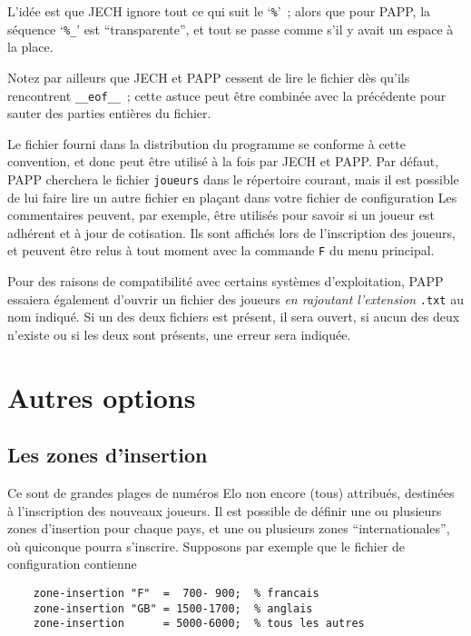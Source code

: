 \documentclass[10pt]{article}
\begin{document}
	L'id\'ee est que JECH ignore tout ce qui suit le `\verb|%|'~; alors
que pour PAPP, la s\'equence `\verb|%_|' est ``transparente'', et tout se
passe comme s'il y avait un espace \`a la place. 

	Notez par ailleurs que JECH et PAPP cessent de lire le fichier
d\`es qu'ils rencontrent \verb|__eof__|~; cette astuce peut \^etre
combin\'ee avec la pr\'ec\'edente pour sauter des parties enti\`eres du
fichier. 

	Le fichier fourni dans la distribution du programme se conforme
\`a cette convention, et donc peut \^etre utilis\'e \`a la fois par JECH
et PAPP.  Par d\'efaut, PAPP cherchera le fichier \verb|joueurs| dans le
r\'epertoire courant, mais il est possible de lui faire lire un autre
fichier en pla\c cant dans votre fichier de configuration
\medbreak
{}
\medbreak
    Les commentaires peuvent, par exemple, \^etre utilis\'es pour
savoir si un joueur est adh\'erent et \`a jour de cotisation.  Ils sont
affich\'es lors de l'inscription des joueurs, et peuvent \^etre relus
\`a tout moment avec la commande \verb|F| du menu principal.

Pour des raisons de compatibilit\'e avec certains syst\`emes d'exploitation, PAPP essaiera \'egalement d'ouvrir un fichier des joueurs {\em en rajoutant l'extension} \verb|.txt| au nom indiqu\'e. Si un des deux fichiers est pr\'esent, il sera ouvert, si aucun des deux n'existe ou si les deux sont pr\'esents, une erreur sera indiqu\'ee.

\section{Autres options}

\subsection{Les zones d'insertion}

	Ce sont de grandes plages de num\'eros Elo non encore (tous)
attribu\'es, destin\'ees \`a l'inscription des nouveaux joueurs.  Il est
possible de d\'efinir une ou plusieurs zones d'insertion pour chaque
pays, et une ou plusieurs zones ``internationales'', o\`u quiconque
pourra s'inscrire.
Supposons par exemple que le fichier de configuration contienne
\begin{verbatim}
    zone-insertion "F"  =  700- 900;  % francais
    zone-insertion "GB" = 1500-1700;  % anglais
    zone-insertion      = 5000-6000;  % tous les autres
\end{verbatim}
\end{document}
